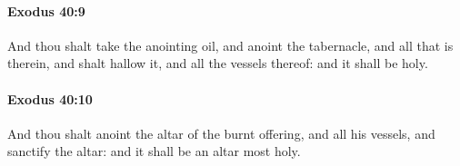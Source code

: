 		\paragraph{Exodus 40:9} %
			\label{EXODUS-40-9}

			And thou shalt take the anointing oil, and anoint the tabernacle, and all that is therein, and shalt hallow it, and all the vessels thereof: and it shall be holy.


		\paragraph{Exodus 40:10} %
			\label{EXODUS-40-10}

			And thou shalt anoint the altar of the burnt offering, and all his vessels, and sanctify the altar: and it shall be an altar most holy.


